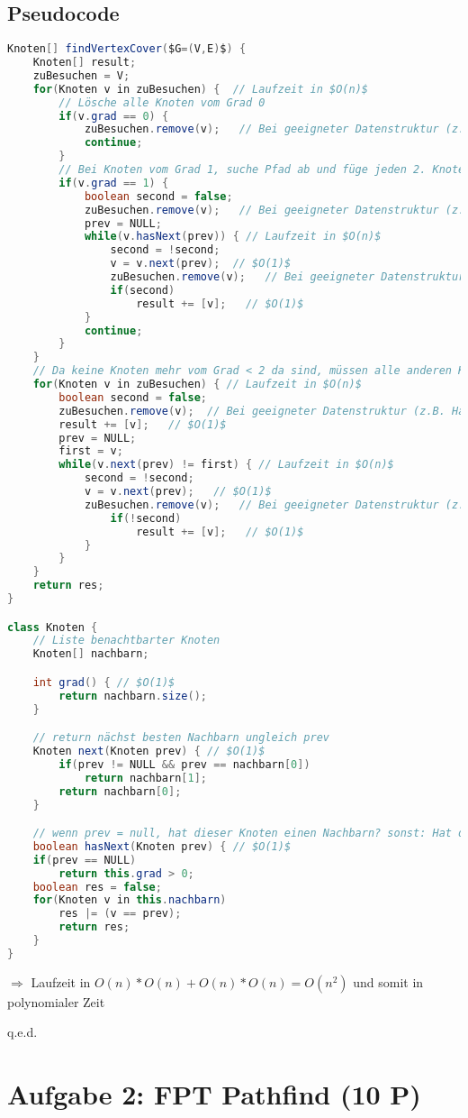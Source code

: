 \documentclass[a4paper,11pt,twoside]{scrartcl}
\newcommand{\qed}{%
	\begin{flushright}
		q.e.d.
	\end{flushright}%
	}
\begin{document}
\subsection{Pseudocode}
\begin{lstlisting}[language=Java]
Knoten[] findVertexCover($G=(V,E)$) {
	Knoten[] result;
	zuBesuchen = V;
	for(Knoten v in zuBesuchen) {  // Laufzeit in $O(n)$
		// Lösche alle Knoten vom Grad 0
		if(v.grad == 0) {
			zuBesuchen.remove(v);   // Bei geeigneter Datenstruktur (z.B. Hashing) $O(1)$
			continue;
		}
		// Bei Knoten vom Grad 1, suche Pfad ab und füge jeden 2. Knoten dem Ergebniss hinzu
		if(v.grad == 1) {
			boolean second = false;
			zuBesuchen.remove(v);   // Bei geeigneter Datenstruktur (z.B. Hashing) $O(1)$
			prev = NULL;
			while(v.hasNext(prev)) { // Laufzeit in $O(n)$
				second = !second;
				v = v.next(prev);  // $O(1)$
				zuBesuchen.remove(v);   // Bei geeigneter Datenstruktur (z.B. Hashing) $O(1)$
				if(second)
					result += [v];   // $O(1)$
			}
			continue;
		}
	} 
	// Da keine Knoten mehr vom Grad < 2 da sind, müssen alle anderen Knoten Zykel bilden
	for(Knoten v in zuBesuchen) { // Laufzeit in $O(n)$
		boolean second = false;
		zuBesuchen.remove(v);  // Bei geeigneter Datenstruktur (z.B. Hashing) $O(1)$
		result += [v];   // $O(1)$
		prev = NULL;
		first = v;
		while(v.next(prev) != first) { // Laufzeit in $O(n)$
			second = !second;
			v = v.next(prev);   // $O(1)$
			zuBesuchen.remove(v);   // Bei geeigneter Datenstruktur (z.B. Hashing) $O(1)$
				if(!second)
					result += [v];   // $O(1)$
			}
		}
	}
	return res;
}

class Knoten {
	// Liste benachtbarter Knoten
	Knoten[] nachbarn;

	int grad() { // $O(1)$
		return nachbarn.size();
	}

	// return nächst besten Nachbarn ungleich prev
	Knoten next(Knoten prev) { // $O(1)$
		if(prev != NULL && prev == nachbarn[0])
			return nachbarn[1];
		return nachbarn[0];
	}

	// wenn prev = null, hat dieser Knoten einen Nachbarn? sonst: Hat dieser Knoten einen Nachbarn ungleich prev?
	boolean hasNext(Knoten prev) { // $O(1)$
	if(prev == NULL)
		return this.grad > 0;
	boolean res = false;
	for(Knoten v in this.nachbarn)
		res |= (v == prev);
		return res;
	}
}
\end{lstlisting}
$\Rightarrow$ Laufzeit in $O(n) * O(n) + O(n) * O(n) = O(n^2)$ und somit in polynomialer Zeit
\qed
\section{Aufgabe 2: FPT Pathfind (10 P)}
\end{document}
